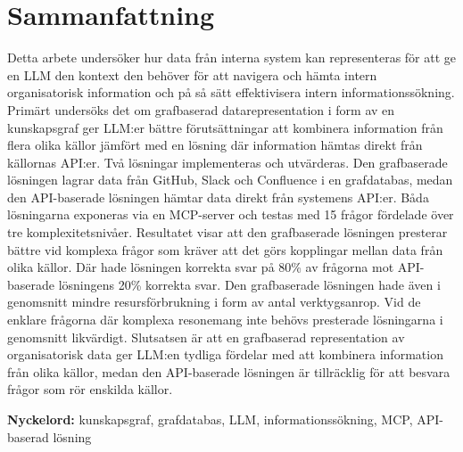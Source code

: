 \section*{Sammanfattning}\label{sec:sammanfattning}
Detta arbete undersöker hur data från interna system kan representeras för att ge en LLM den kontext den behöver för att navigera och hämta intern organisatorisk information och på så sätt effektivisera intern informationssökning.
Primärt undersöks det om grafbaserad datarepresentation i form av en kunskapsgraf ger LLM:er bättre förutsättningar att kombinera information från flera olika källor jämfört med en lösning där information hämtas direkt från källornas API:er.
Två lösningar implementeras och utvärderas. Den grafbaserade lösningen lagrar data från GitHub, Slack och Confluence i en grafdatabas, medan den API-baserade lösningen hämtar data direkt från systemens API:er.
Båda lösningarna exponeras via en MCP-server och testas med 15 frågor fördelade över tre komplexitetsnivåer.
Resultatet visar att den grafbaserade lösningen presterar bättre vid komplexa frågor som kräver att det görs kopplingar mellan data från olika källor.
Där hade lösningen korrekta svar på 80\% av frågorna mot API-baserade lösningens 20\% korrekta svar. Den grafbaserade lösningen hade även i genomsnitt mindre resursförbrukning i form av antal verktygsanrop.
Vid de enklare frågorna där komplexa resonemang inte behövs presterade lösningarna i genomsnitt likvärdigt.
Slutsatsen är att en grafbaserad representation av organisatorisk data ger LLM:en tydliga fördelar med att kombinera information från olika källor, medan den API-baserade lösningen är tillräcklig för att besvara frågor som rör enskilda källor.

\textbf{Nyckelord:} kunskapsgraf, grafdatabas, LLM, informationssökning, MCP,
  API-baserad lösning 




